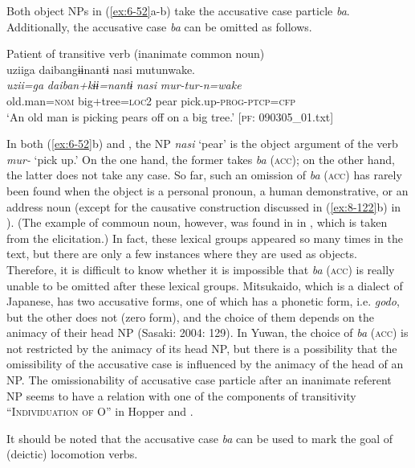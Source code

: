 Both object NPs in (\ref{ex:6-52}a-b) take the accusative case particle \textit{ba}. Additionally, the accusative case \textit{ba} can be omitted as follows.

\ea\label{ex:6-53}
 Patient of transitive verb (inanimate common noun)\\

{\TM}
\glll uziiga  daibangɨɨnantɨ  nasi  mutunwake.\\
\textit{uzii=ga}  \textit{daiban+kɨɨ=nantɨ}  \textit{nasi}  \textit{mur-tur-n=wake}\\
    old.man=\textsc{nom}  big+tree=\textsc{loc2}  pear  pick.up-\textsc{prog}-\textsc{ptcp}=\textsc{cfp}\\
\glt    ‘An old man is picking pears off on a big tree.’ [\textsc{pf}: 090305\_01.txt]
\z

In both (\ref{ex:6-52}b) and , the NP \textit{nasi} ‘pear’ is the object argument of the verb \textit{mur-} ‘pick up.’ On the one hand, the former takes \textit{ba} (\textsc{acc}); on the other hand, the latter does not take any case. So far, such an omission of \textit{ba} (\textsc{acc}) has rarely been found when the object is a personal pronoun, a human demonstrative, or an address noun (except for the causative construction discussed in (\ref{ex:8-122}b) in ). (The example of commoun noun, however, was found in  in , which is taken from the elicitation.) In fact, these lexical groups appeared so many times in the text, but there are only a few instances where they are used as objects. Therefore, it is difficult to know whether it is impossible that \textit{ba} (\textsc{acc}) is really unable to be omitted after these lexical groups. Mitsukaido, which is a dialect of Japanese, has two accusative forms, one of which has a phonetic form, i.e. \textit{godo}, but the other does not (zero form), and the choice of them depends on the animacy of their head NP (Sasaki: 2004: 129). In Yuwan, the choice of \textit{ba} (\textsc{acc}) is not restricted by the animacy of its head NP, but there is a possibility that the omissibility of the accusative case is influenced by the animacy of the head of an NP. The omissionability of accusative case particle after an inanimate referent NP seems to have a relation with one of the components of transitivity “I\textsc{ndividuation} \textsc{of} O” in Hopper and \citet[252]{Thompson1980}.

It should be noted that the accusative case \textit{ba} can be used to mark the goal of (deictic) locomotion verbs.

